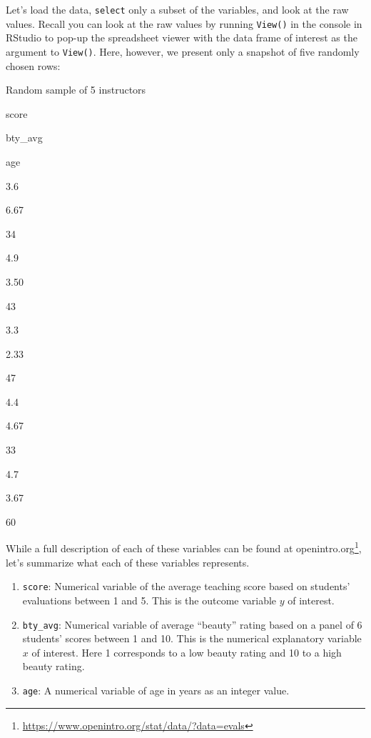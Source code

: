 \documentclass[12pt,]{krantz}
\makeatletter
\newenvironment{Shaded}{\begin{snugshade}}{\end{snugshade}}
\newcommand{\KeywordTok}[1]{\textcolor[rgb]{0.27,0.27,0.27}{\textbf{#1}}}
\newcommand{\DecValTok}[1]{\textcolor[rgb]{0.06,0.06,0.06}{#1}}
\newcommand{\StringTok}[1]{\textcolor[rgb]{0.5,0.5,0.5}{#1}}
\newcommand{\OperatorTok}[1]{\textcolor[rgb]{0.43,0.43,0.43}{\textbf{#1}}}
\newcommand{\NormalTok}[1]{#1}
\providecommand{\tightlist}{%
  \setlength{\itemsep}{0pt}\setlength{\parskip}{0pt}}
\renewcommand{\href}[2]{#2\footnote{\url{#1}}}
\newenvironment{kframe}{%
\medskip{}
\setlength{\fboxsep}{.8em}
 \def\at@end@of@kframe{}%
 \ifinner\ifhmode%
  \def\at@end@of@kframe{\end{minipage}}%
  \begin{minipage}{\columnwidth}%
 \fi\fi%
 \def\FrameCommand##1{\hskip\@totalleftmargin \hskip-\fboxsep
 \colorbox{shadecolor}{##1}\hskip-\fboxsep
     \hskip-\linewidth \hskip-\@totalleftmargin \hskip\columnwidth}%
 \MakeFramed {\advance\hsize-\width
   \@totalleftmargin\z@ \linewidth\hsize
   \@setminipage}}%
 {\par\unskip\endMakeFramed%
 \at@end@of@kframe}
\renewenvironment{Shaded}{\begin{kframe}}{\end{kframe}}
\makeatother
\begin{document}
Let's load the data, \texttt{select} only a subset of the variables, and
look at the raw values. Recall you can look at the raw values by running
\texttt{View()} in the console in RStudio to pop-up the spreadsheet
viewer with the data frame of interest as the argument to
\texttt{View()}. Here, however, we present only a snapshot of five
randomly chosen rows:

\begin{Shaded}
\end{Shaded}

\begin{Shaded}
\end{Shaded}

\label{tab:unnamed-chunk-166}Random sample of 5 instructors

score

bty\_avg

age

3.6

6.67

34

4.9

3.50

43

3.3

2.33

47

4.4

4.67

33

4.7

3.67

60

While a full description of each of these variables can be found at
\href{https://www.openintro.org/stat/data/?data=evals}{openintro.org},
let's summarize what each of these variables represents.

\begin{enumerate}
\def\labelenumi{\arabic{enumi}.}
\tightlist
\item
  \texttt{score}: Numerical variable of the average teaching score based
  on students' evaluations between 1 and 5. This is the outcome variable
  \(y\) of interest.
\item
  \texttt{bty\_avg}: Numerical variable of average ``beauty'' rating
  based on a panel of 6 students' scores between 1 and 10. This is the
  numerical explanatory variable \(x\) of interest. Here 1 corresponds
  to a low beauty rating and 10 to a high beauty rating.
\item
  \texttt{age}: A numerical variable of age in years as an integer
  value.
\end{enumerate}
\end{document}
